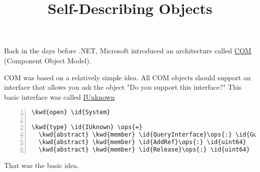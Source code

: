 \documentclass{article}
\title{Self-Describing Objects}
\date{}
\newcommand{\id}[1]{\textcolor{black}{#1}}
\newcommand{\kwd}[1]{\textcolor{navy}{#1}}
\newcommand{\ops}[1]{\textcolor{purple}{#1}}
\begin{document}
\maketitle



Back in the days before .NET, Microsoft introduced an architecture called \href{http://en.wikipedia.org/wiki/Component\_Object\_Model\#Interfaces}{COM} (Component Object Model).


COM was based on a relatively simple idea.  All COM objects should support an interface that allows you
ask the object "Do you support this interface?"  This basic interface was called \href{http://en.wikipedia.org/wiki/IUnknown}{IUnknown}
\begin{Verbatim}[commandchars=\\\{\}, numbers=left]
\kwd{open} \id{System}

\kwd{type} \id{IUknown} \ops{=} 
  \kwd{abstract} \kwd{member} \id{QueryInterface}\ops{:} \id{Guid} \kwd{->} (\id{int} \ops{*} \id{obj})
  \kwd{abstract} \kwd{member} \id{AddRef}\ops{:} \id{uint64}
  \kwd{abstract} \kwd{member} \id{Release}\ops{:} \id{uint64}
\end{Verbatim}



That was the basic idea.
\end{document}
